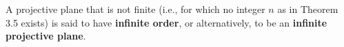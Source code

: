 A projective plane that is not finite (i.e., for which no integer $n$ as in Theorem 3.5 exists) is said to have \textbf{infinite order}, or alternatively, to be an \textbf{infinite projective plane}.
